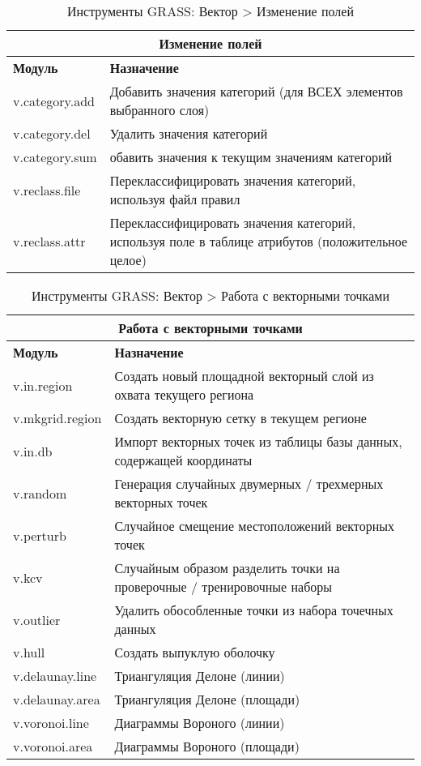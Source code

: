 {\renewcommand{\arraystretch}{0.7}
\begin{table}[H]
\centering
 \begin{tabular}{|p{4cm}|p{11cm}|}
  \hline \multicolumn{2}{|c|}{\textbf{Изменение полей}} \\
  \hline \textbf{Модуль} & \textbf{Назначение} \\
  \hline v.category.add & Добавить значения категорий (для ВСЕХ элементов
  выбранного слоя)\\
  \hline v.category.del & Удалить значения категорий \\
  \hline v.category.sum & обавить значения к текущим значениям категорий \\
  \hline v.reclass.file & Переклассифицировать значения категорий,
  используя файл правил \\
  \hline v.reclass.attr & Переклассифицировать значения категорий,
  используя поле в таблице атрибутов (положительное целое) \\
\hline
\end{tabular}
\caption{Инструменты GRASS: Вектор > Изменение полей}
\end{table}}

{\renewcommand{\arraystretch}{0.7}
\begin{table}[H]
\centering
 \begin{tabular}{|p{4cm}|p{11cm}|}
  \hline \multicolumn{2}{|c|}{\textbf{Работа с векторными точками}} \\
  \hline \textbf{Модуль} & \textbf{Назначение} \\
  \hline v.in.region & Создать новый площадной векторный слой из охвата
  текущего региона \\
  \hline v.mkgrid.region & Создать векторную сетку в текущем регионе \\
  \hline v.in.db & Импорт векторных точек из таблицы базы данных, содержащей
  координаты \\
  \hline v.random & Генерация случайных двумерных / трехмерных векторных
  точек \\
  \hline v.perturb & Случайное смещение местоположений векторных точек \\
  \hline v.kcv & Случайным образом разделить точки на проверочные / тренировочные
  наборы \\
  \hline v.outlier & Удалить обособленные точки из набора точечных данных \\
  \hline v.hull & Создать выпуклую оболочку \\
  \hline v.delaunay.line & Триангуляция Делоне (линии) \\
  \hline v.delaunay.area & Триангуляция Делоне (площади) \\
  \hline v.voronoi.line & Диаграммы Вороного (линии) \\
  \hline v.voronoi.area & Диаграммы Вороного (площади) \\
\hline
\end{tabular}
\caption{Инструменты GRASS: Вектор > Работа с векторными точками}
\end{table}}


